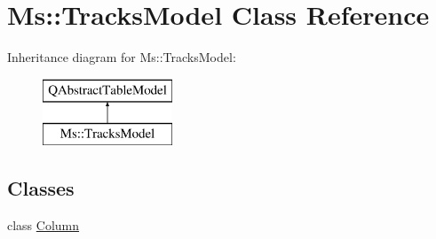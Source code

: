 \hypertarget{class_ms_1_1_tracks_model}{}\section{Ms\+:\+:Tracks\+Model Class Reference}
\label{class_ms_1_1_tracks_model}
Inheritance diagram for Ms\+:\+:Tracks\+Model\+:\begin{figure}[H]
\begin{center}
\leavevmode
\includegraphics[height=2.000000cm]{class_ms_1_1_tracks_model}
\end{center}
\end{figure}
\subsection*{Classes}
\begin{DoxyCompactItemize}
\item 
class \hyperlink{class_ms_1_1_tracks_model_1_1_column}{Column}
\end{DoxyCompactItemize}
